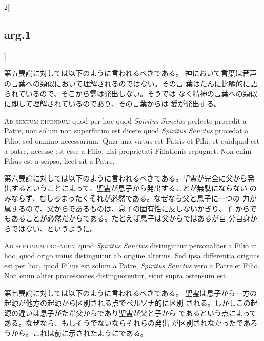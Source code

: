 \documentclass[paper=a4paper,fontsize=10pt,jafontsize=9pt,titlepage]{jlreq}
\begin{document}
\begin{paracol}{2}[\subsection{arg.1}]
\switchcolumn

第五異論に対しては以下のように言われるべきである。
神において言葉は音声の言葉への類似において理解されるのではない。その言
 葉はたんに比喩的に語られているので、そこから霊は発出しない。そうでは
 なく精神の言葉への類似に即して理解されているのであり、その言葉からは
 愛が発出する。

\switchcolumn*[\subsection{ad.6}]

{\scshape Ad sextum dicendum} quod per hoc quod {\itshape  Spiritus Sanctus}
perfecte procedit a Patre, non solum non superfluum est dicere quod
{\itshape  Spiritus Sanctus} procedat a Filio; sed omnino
necessarium. Quia una virtus est Patris et Filii; et quidquid est a
patre, necesse est esse a Filio, nisi proprietati Filiationis
repugnet. Non enim Filius est a seipso, licet sit a Patre.

\switchcolumn

第六異論に対しては以下のように言われるべきである。聖霊が完全に父から発
 出するということによって、聖霊が息子から発出することが無駄にならない
 のみならず、むしろまったくそれが必然である。なぜなら父と息子に一つの
 力が属するので、父からであるものは、息子の固有性に反しないかぎり、子
 からでもあることが必然だからである。たとえば息子は父からではあるが自
 分自身からではない、というように。

\switchcolumn*[\subsection{ad.7}]

{\scshape Ad septimum dicendum} quod {\itshape  Spiritus Sanctus} distinguitur
personaliter a Filio in hoc, quod origo unius distinguitur ab origine
alterius. Sed ipsa differentia originis est per hoc, quod Filius est
solum a Patre, {\itshape  Spiritus Sanctus} vero a Patre et Filio. Non
enim aliter processiones distinguerentur, sicut supra ostensum est.

\switchcolumn

第七異論に対しては以下のように言われるべきである。
聖霊は息子から一方の起源が他方の起源から区別される点でペルソナ的に区別
 される。しかしこの起源の違いは息子がただ父からであり聖霊が父と子から
 であるという点によってある。なぜなら、もしそうでないならそれらの発出
 が区別されなかったであろうから。これは前に示されたようにである。

\end{paracol}
\newpage
\end{document}
